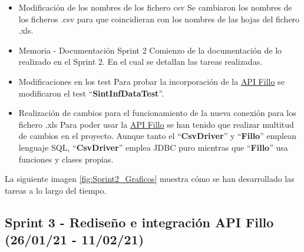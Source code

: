 \begin{itemize}
	\item Modificación de los nombres de los fichero csv 
		Se cambiaron los nombres de los ficheros .csv para que coincidieran con los nombres de las hojas del fichero .xls. 
	\item Memoria - Documentación Sprint 2
		Comienzo de la documentación de lo realizado en el Sprint 2. En el cual se detallan las tareas realizadas.
	\item Modificaciones en los test
		Para probar la incorporación de la \href{https://codoid.com/fillo/}{API Fillo} se modificaron el test  ``\textbf{\textbf{SintInfDataTest}}''.
	\item Realización de cambios para el funcionamiento de la nueva conexión para los fichero .xls 
		Para poder usar la \href{https://codoid.com/fillo/}{API Fillo} se han tenido que realizar multitud de cambios en el proyecto. Aunque tanto el ``\textbf{\textbf{CsvDriver}}'' y ``\textbf{\textbf{Fillo}}'' emplean lenguaje SQL, ``\textbf{CsvDriver}'' emplea JDBC puro mientras que ``\textbf{Fillo}'' usa funciones y clases propias.
\end{itemize}

La siguiente imagen \ref{fig:Sprint2_Graficos} muestra cómo se han desarrollado las tareas a lo largo del tiempo.


\subsection{Sprint 3 - Rediseño e integración API Fillo (26/01/21 - 11/02/21)}

